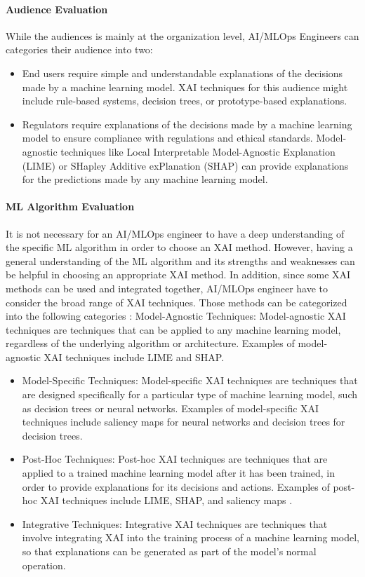 \documentclass[conference]{IEEEtran}
\begin{document}
\paragraph{Audience Evaluation} While the audiences is mainly at the organization level, AI/MLOps Engineers can categories their audience into two:
\begin{itemize}
\item End users require simple and understandable explanations of the decisions made by a machine learning model. XAI techniques for this audience might include rule-based systems, decision trees, or prototype-based explanations.
\item Regulators require explanations of the decisions made by a machine learning model to ensure compliance with regulations and ethical standards. Model-agnostic techniques like Local Interpretable Model-Agnostic Explanation (LIME) \cite{lime} or SHapley Additive exPlanation (SHAP) \cite{shap} can provide explanations for the predictions made by any machine learning model.
\end{itemize}
\paragraph{ML Algorithm Evaluation} It is not necessary for an AI/MLOps engineer to have a deep understanding of the specific ML algorithm in order to choose an XAI method. However, having a general understanding of the ML algorithm and its strengths and weaknesses can be helpful in choosing an appropriate XAI method. In addition, since some XAI methods can be used and integrated together, AI/MLOps engineer have to consider the broad range of XAI techniques. Those methods can be categorized into the following categories \cite{XAIREF}:
Model-Agnostic Techniques: Model-agnostic XAI techniques are techniques that can be applied to any machine learning model, regardless of the underlying algorithm or architecture. Examples of model-agnostic XAI techniques include LIME and SHAP.
\begin{itemize}
	\item Model-Specific Techniques: Model-specific XAI techniques \cite{XAIREF} are techniques that are designed specifically for a particular type of machine learning model, such as decision trees or neural networks. Examples of model-specific XAI techniques include saliency maps for neural networks and decision trees for decision trees.

	\item Post-Hoc Techniques: Post-hoc XAI techniques \cite{XAIREF} are techniques that are applied to a trained machine learning model after it has been trained, in order to provide explanations for its decisions and actions. Examples of post-hoc XAI techniques include LIME, SHAP, and saliency maps \cite{kadir2001saliency}.

	\item Integrative Techniques: Integrative XAI techniques are techniques that involve integrating XAI into the training process of a machine learning model, so that explanations can be generated as part of the model's normal operation.
\end{itemize}
\end{document}
